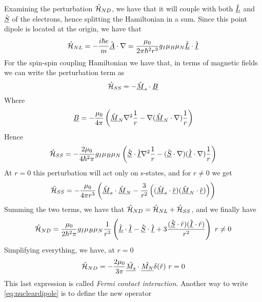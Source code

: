 \documentclass[../qm.tex]{subfiles}
\begin{document}
	Examining the perturbation $\hat{\mathcal{H}}_{ND}$, we have that it will couple with both $\hat{\underline{L}}$ and $\hat{\underline{S}}$ of the electrons, hence splitting the Hamiltonian in a sum. Since this point dipole is located at the origin, we have that
	\begin{equation}
		\hat{\mathcal{H}}_{NL}=-\frac{i\hbar e}{m}\hat{\underline{A}}\cdot\nabla=\frac{\mu_0}{2\pi\hbar^2r^3}g_I\mu_B\mu_N\hat{\underline{L}}\cdot\hat{\underline{I}}
	\end{equation}
	For the spin-spin coupling Hamiltonian we have that, in terms of magnetic fields we can write the perturbation term as
	\begin{equation}
		\hat{\mathcal{H}}_{SS}=-\hat{\underline{M}}_s\cdot\underline{B}
		\label{eq:spinspinham}
	\end{equation}
	Where
	\begin{equation}
		\underline{B}=-\frac{\mu_0}{4\pi}\left( \hat{\underline{M}}_N\nabla^2\frac{1}{r}-\nabla(\hat{\underline{M}}_N\cdot\nabla)\frac{1}{r} \right)
		\label{eq:magneticdipolenucleus}
	\end{equation}
	Hence
	\begin{equation}
		\hat{\mathcal{H}}_{SS}=-\frac{2\mu_0}{4\hbar^2\pi}g_I\mu_B\mu_N\left( \hat{\underline{S}}\cdot\hat{\underline{I}}\nabla^2\frac{1}{r}-(\hat{\underline{S}}\cdot\nabla)(\hat{\underline{I}}\cdot\nabla)\frac{1}{r} \right)
		\label{eq:spinspincoupling}
	\end{equation}
	At $r=0$ this perturbation will act only on s-states, and for $r\ne0$ we get
	\begin{equation*}
		\hat{\mathcal{H}}_{SS}=-\frac{\mu_0}{4\pi r^3}\left( \hat{\underline{M}}_s\cdot\hat{\underline{M}}_N-\frac{3}{r^2}\left( (\hat{\underline{M}}_s\cdot\hat{\underline{r}})(\hat{\underline{M}}_N\cdot\hat{\underline{r}}) \right) \right)
	\end{equation*}
	Summing the two terms, we have that $\hat{\mathcal{H}}_{ND}=\hat{\mathcal{H}}_{NL}+\hat{\mathcal{H}}_{SS}$, and we finally have
	\begin{equation}
		\hat{\mathcal{H}}_{ND}=\frac{\mu_0}{2\hbar^2\pi}g_I\mu_B\mu_N\frac{1}{r^3}\left( \hat{\underline{L}}\cdot\hat{\underline{I}}-\hat{\underline{S}}\cdot\hat{\underline{I}}+3\frac{(\hat{\underline{S}}\cdot\hat{r})(\hat{\underline{I}}\cdot\hat{r})}{r^2} \right)\ r\ne0
		\label{eq:nucleardipole}
	\end{equation}
	Simplifying everything, we have, at $r=0$
	\begin{equation}
		\opr{\ham}_{ND}=-\frac{2\mu_0}{3\pi}\vecopr{M_s}\cdot\vecopr{M_N}\delta(\opr{r})\ r=0
		\label{eq:centernucleardipole}
	\end{equation}
	This last expression is called \textit{Fermi contact interaction}. Another way to write \eqref{eq:nucleardipole} is to define the new operator
\end{document}
